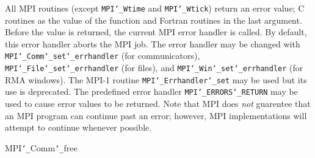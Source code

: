 \par
{}
\par
All MPI routines (except {\tt MPI{\tt \char`\_}Wtime} and {\tt MPI{\tt \char`\_}Wtick}) return an error value;
C routines as the value of the function and Fortran routines in the last
argument.  Before the value is returned, the current MPI error handler is
called.  By default, this error handler aborts the MPI job.  The error handler
may be changed with {\tt MPI{\tt \char`\_}Comm{\tt \char`\_}set{\tt \char`\_}errhandler} (for communicators),
{\tt MPI{\tt \char`\_}File{\tt \char`\_}set{\tt \char`\_}errhandler} (for files), and {\tt MPI{\tt \char`\_}Win{\tt \char`\_}set{\tt \char`\_}errhandler} (for
RMA windows).  The MPI-1 routine {\tt MPI{\tt \char`\_}Errhandler{\tt \char`\_}set} may be used but
its use is deprecated.  The predefined error handler
{\tt MPI{\tt \char`\_}ERRORS{\tt \char`\_}RETURN} may be used to cause error values to be returned.
Note that MPI does {\em not} guarentee that an MPI program can continue past
an error; however, MPI implementations will attempt to continue whenever
possible.
\par
{}
\par
{}
 MPI{\tt \char`\_}Comm{\tt \char`\_}free
\nextline
{}
\endmanpage
